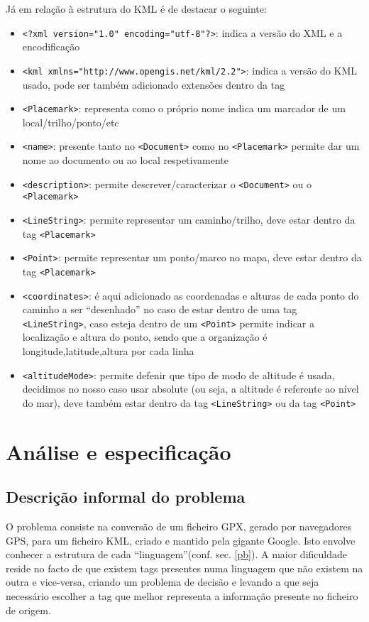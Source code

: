\documentclass{llncs}
\begin{document}
Já em relação à estrutura do KML é de destacar o seguinte:
\begin{itemize}
    \item \verb|<?xml version="1.0" encoding="utf-8"?>|: indica a versão do XML e a encodificação 
    \item \verb|<kml xmlns="http://www.opengis.net/kml/2.2">|: indica a versão do KML usado, pode ser também adicionado extensões dentro da tag
    \item \verb|<Placemark>|: representa como o próprio nome indica um marcador de um local/trilho/ponto/etc
    \item \verb|<name>|: presente tanto no \verb|<Document>| como no \verb|<Placemark>| permite dar um nome ao documento ou ao local respetivamente
    \item \verb|<description>|: permite descrever/caracterizar o \verb|<Document>| ou o \verb|<Placemark>|
    \item \verb|<LineString>|: permite representar um caminho/trilho, deve estar dentro da tag \verb|<Placemark>|
    \item \verb|<Point>|: permite representar um ponto/marco no mapa, deve estar dentro da tag \verb|<Placemark>|
    \item \verb|<coordinates>|: é aqui adicionado as coordenadas e alturas de cada ponto do caminho a ser ``desenhado'' no caso de estar dentro de uma tag \verb|<LineString>|, caso esteja dentro de um \verb|<Point>| permite indicar a localização e altura do ponto, sendo que a organização é longitude,latitude,altura por cada linha
    \item \verb|<altitudeMode>|: permite defenir que tipo de modo de altitude é usada, decidimos no nosso caso usar absolute (ou seja, a altitude é referente ao nível do mar), deve também estar dentro da tag \verb|<LineString>| ou da tag \verb|<Point>|
\end{itemize}

\section{Análise e especificação}

\subsection{Descrição informal do problema}
O problema consiste na conversão de um ficheiro GPX, gerado por navegadores GPS, para um ficheiro KML, criado e mantido pela gigante Google. Isto envolve conhecer a estrutura de cada ``linguagem''(conf. sec. \ref{pb}). A maior dificuldade reside no facto de que existem tags presentes numa linguagem que não existem na outra e vice-versa, criando um problema de decisão e levando a que seja necessário escolher a tag que melhor representa a informação presente no ficheiro de origem.
\end{document}
